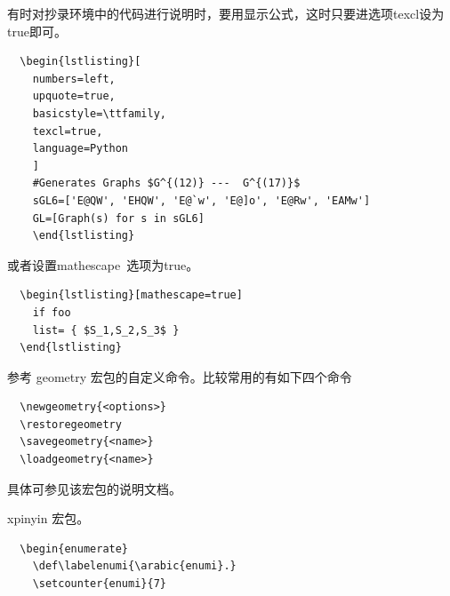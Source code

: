 
有时对抄录环境中的代码进行说明时，要用显示公式，这时只要进选项texcl设为true即可。

\begin{verbatim}
  \begin{lstlisting}[
    numbers=left,
    upquote=true,
    basicstyle=\ttfamily,
    texcl=true,
    language=Python
    ]
    #Generates Graphs $G^{(12)} ---  G^{(17)}$
    sGL6=['E@QW', 'EHQW', 'E@`w', 'E@]o', 'E@Rw', 'EAMw']
    GL=[Graph(s) for s in sGL6]
    \end{lstlisting}
\end{verbatim}
%  
%  

或者设置mathescape~选项为true。

\begin{verbatim}
  \begin{lstlisting}[mathescape=true]
    if foo
    list= { $S_1,S_2,S_3$ }
  \end{lstlisting}
\end{verbatim}





参考 geometry 宏包的自定义命令。比较常用的有如下四个命令
\begin{verbatim}
  \newgeometry{<options>}
  \restoregeometry
  \savegeometry{<name>}
  \loadgeometry{<name>}
\end{verbatim}
具体可参见该宏包的说明文档。



xpinyin 宏包。









\begin{verbatim}
  \begin{enumerate}
    \def\labelenumi{\arabic{enumi}.}
    \setcounter{enumi}{7}
\end{verbatim}


